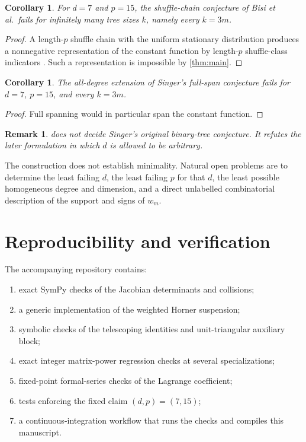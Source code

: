 \documentclass[11pt,reqno]{amsart}
\newtheorem{corollary}[theorem]{Corollary}
\newtheorem{remark}[theorem]{Remark}
\begin{document}
\begin{corollary}\label{cor:chain}
For $d=7$ and $p=15$, the shuffle-chain conjecture of Bisi et al.\ fails for
infinitely many tree sizes $k$, namely every $k=3m$.
\end{corollary}

\begin{proof}
A length-$p$ shuffle chain with the uniform stationary distribution produces
a nonnegative representation of the constant function by length-$p$
shuffle-class indicators \cite[Theorem~1.6 and its proof]{BisiEtAl}.  Such a
representation is impossible by \cref{thm:main}.
\end{proof}

\begin{corollary}\label{cor:singer}
The all-degree extension of Singer's full-span conjecture fails for
$d=7$, $p=15$, and every $k=3m$.
\end{corollary}

\begin{proof}
Full spanning would in particular span the constant function.
\end{proof}

\begin{remark}
 does not decide Singer's original binary-tree conjecture.
It refutes the later formulation in which $d$ is allowed to be arbitrary.
\end{remark}

The construction does not establish minimality.  Natural open problems are
to determine the least failing $d$, the least failing $p$ for that $d$, the
least possible homogeneous degree and dimension, and a direct unlabelled
combinatorial description of the support and signs of $w_m$.

\section{Reproducibility and verification}

The accompanying repository contains:
\begin{enumerate}[label=(\roman*)]
\item exact SymPy checks of the Jacobian determinants and collisions;
\item a generic implementation of the weighted Horner suspension;
\item symbolic checks of the telescoping identities and unit-triangular
      auxiliary block;
\item exact integer matrix-power regression checks at several
      specializations;
\item fixed-point formal-series checks of the Lagrange coefficient;
\item tests enforcing the fixed claim $(d,p)=(7,15)$;
\item a continuous-integration workflow that runs the checks and compiles
      this manuscript.
\end{enumerate}
\end{document}
